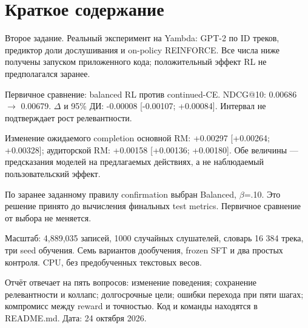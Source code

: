 \FloatBarrier
\section*{Краткое содержание}

Второе задание. Реальный эксперимент на Yambda: GPT-2 по ID треков, предиктор доли дослушивания и on-policy REINFORCE. Все числа ниже получены запуском приложенного кода; положительный эффект RL не предполагался заранее.

Первичное сравнение: balanced RL против continued-CE. NDCG@10: 0.00686 \ensuremath{\rightarrow} 0.00679. \ensuremath{\Delta} и 95\% ДИ: -0.00008 [-0.00107; +0.00084]. Интервал не подтверждает рост релевантности.

Изменение ожидаемого completion основной RM: +0.00297 [+0.00264; +0.00328]; аудиторской RM: +0.00158 [+0.00136; +0.00180]. Обе величины --- предсказания моделей на предлагаемых действиях, а не наблюдаемый пользовательский эффект.

По заранее заданному правилу confirmation выбран Balanced, \ensuremath{\beta}=.10. Это решение принято до вычисления финальных test metrics. Первичное сравнение от выбора не меняется.

Масштаб: 4,889,035 записей, 1000 случайных слушателей, словарь 16 384 трека, три seed обучения. Семь вариантов дообучения, frozen SFT и два простых контроля. CPU, без предобученных текстовых весов.

Отчёт отвечает на пять вопросов: изменение поведения; сохранение релевантности и коллапс; долгосрочные цели; ошибки перехода при пяти шагах; компромисс между reward и точностью. Код и команды находятся в README.md. Дата: 24 октября 2026.

